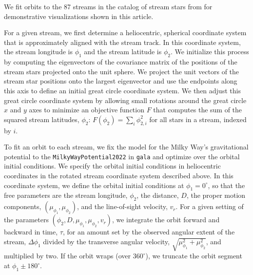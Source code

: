 \documentclass[final,5p,times,twocolumn,authoryear]{elsarticle}
\begin{document}
We fit orbits to the 87 streams in the catalog of stream stars from \citet{ibata:TODO}
for demonstrative visualizations shown in this article.

For a given stream, we first determine a heliocentric, spherical coordinate system that
is approximately aligned with the stream track.
In this coordinate system, the stream longitude is $\phi_1$ and the stream latitude is
$\phi_2$.
We initialize this process by computing the eigenvectors of the covariance matrix of the
positions of the stream stars projected onto the unit sphere.
We project the unit vectors of the stream star positions onto the largest eigenvector
and use the endpoints along this axis to define an initial great circle coordinate
system.
We then adjust this great circle coordinate system by allowing small rotations around
the great circle $x$ and $y$ axes to minimize an objective function $F$ that computes
the sum of the squared stream latitudes, $\phi_2$: $F(\phi_2) = \sum_i \phi_{2,i}^2$ for
all stars in a stream, indexed by $i$.

To fit an orbit to each stream, we fix the model for the Milky Way's gravitational
potential to the \texttt{MilkyWayPotential2022} in \texttt{gala} \citep{gala} and
optimize over the orbital initial conditions.
We specify the orbital initial conditions in heliocentric coordinates in the rotated
stream coordinate system described above.
In this coordinate system, we define the orbital initial conditions at $\phi_1=0^\circ$,
so that the free parameters are the stream longitude, $\phi_2$, the distance, $D$, the
proper motion components, $(\mu_{\phi_1}, \mu_{\phi_2})$, and the line-of-sight
velocity, $v_r$.
For a given setting of the parameters $(\phi_2, D, \mu_{\phi_1}, \mu_{\phi_2}, v_r)$, we
integrate the orbit forward and backward in time, $\tau$, for an amount set by the
observed angular extent of the stream, $\Delta \phi_1$ divided by the transverse angular
velocity, $\sqrt{\mu_{\phi_1}^2 + \mu_{\phi_2}^2}$, and multiplied by two.
If the orbit wraps (over $360^\circ$), we truncate the orbit segment at $\phi_1 \pm
180^\circ$.
\end{document}
